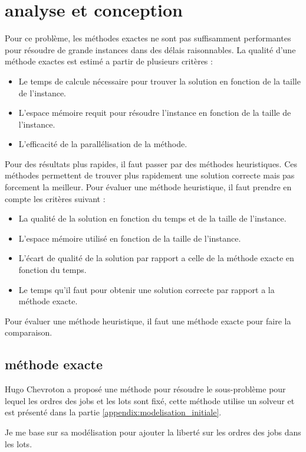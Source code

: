 \chapter{analyse et conception}

Pour ce problème, les méthodes exactes ne sont pas suffisamment performantes pour résoudre de grande instances dans des délais raisonnables.
La qualité d'une méthode exactes est estimé a partir de plusieurs critères :
\begin{itemize}
	\item Le temps de calcule nécessaire pour trouver la solution en fonction de la taille de l'instance.
	\item L'espace mémoire requit pour résoudre l'instance en fonction de la taille de l'instance.
	\item L'efficacité de la parallélisation de la méthode.
\end{itemize}
Pour des résultats plus rapides, il faut passer par des méthodes heuristiques.
Ces méthodes permettent de trouver plus rapidement une solution correcte mais pas forcement la meilleur.
Pour évaluer une méthode heuristique, il faut prendre en compte les critères suivant :
\begin{itemize}
	\item La qualité de la solution en fonction du temps et de la taille de l'instance.
	\item L'espace mémoire utilisé en fonction de la taille de l'instance.
	\item L'écart de qualité de la solution par rapport a celle de la méthode exacte en fonction du temps.
	\item Le temps qu'il faut pour obtenir une solution correcte par rapport a la méthode exacte.
\end{itemize}
Pour évaluer une méthode heuristique, il faut une méthode exacte pour faire la comparaison.

\section{méthode exacte}
Hugo Chevroton a proposé une méthode pour résoudre le sous-problème pour lequel les ordres des jobs et les lots sont fixé,
cette méthode utilise un solveur et est présenté dans la partie \autoref{appendix:modelisation_initiale}.

Je me base sur sa modélisation pour ajouter la liberté sur les ordres des jobs dans les lots.



